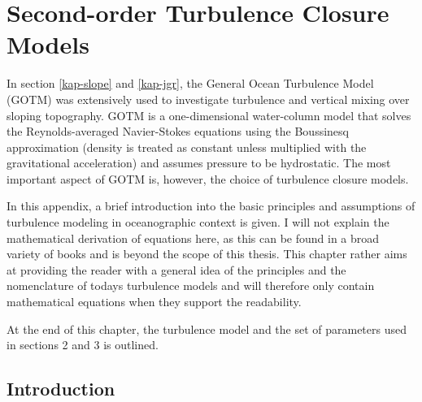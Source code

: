 \chapter{Second-order Turbulence Closure Models}

In section \ref{kap-slope} and \ref{kap-jgr}, the General Ocean Turbulence Model 
(GOTM) was extensively used to investigate turbulence and vertical mixing over 
sloping topography. GOTM is a one-dimensional water-column model that solves 
the Reynolds-averaged Navier-Stokes equations using the Boussinesq approximation 
(density is treated as constant unless multiplied with the gravitational 
acceleration) and assumes pressure to be hydrostatic. The most important aspect 
of GOTM is, however, the choice of turbulence closure models. 

In this appendix, a brief 
introduction into the basic principles and assumptions of turbulence modeling 
in 
oceanographic context is given. I will not explain the mathematical derivation 
of equations here, as this can be found in a broad variety of books and is 
beyond the scope of this thesis. This chapter rather aims at providing 
the reader with a general idea of the principles and the nomenclature of todays 
turbulence models and will therefore only contain mathematical equations when 
they support the readability.

At the end of this chapter, the turbulence model and the set of parameters used 
in sections 2 and 3 is outlined.  

\section{Introduction}\label{introturbm}

